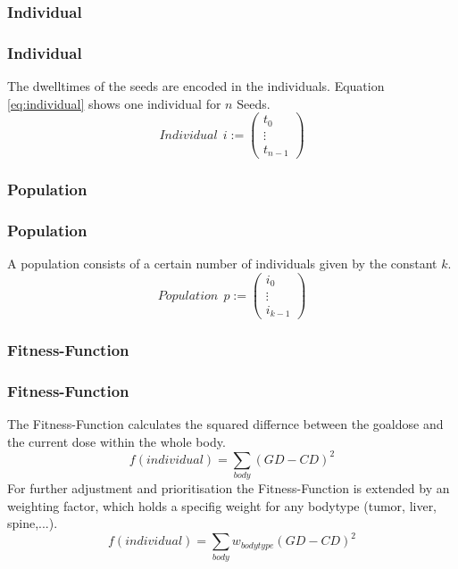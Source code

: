 \documentclass{beamer}
\begin{document}
\subsubsection{Individual}

 \begin{frame}
 \frametitle{Individual}
 The dwelltimes of the seeds are encoded in the individuals. Equation \eqref{eq:individual} shows one individual for $n  $ Seeds.
 \begin{equation}
 \label{eq:individual}
 Individual \ \ i := \begin{pmatrix}
 t_{0} \\ \vdots \\ t_{n-1} 	
\end{pmatrix}   
 \end{equation}
 \end{frame}
 
\subsubsection{Population}
 \begin{frame}
 \frametitle{Population}
 A population consists of a certain number of individuals given by the constant $ k $.
 \begin{equation}
 \label{eq:population}
 Population \ \ p := \begin{pmatrix}
 i_{0} \\ \vdots \\ i_{k-1} 	
\end{pmatrix}   
 \end{equation}
 \end{frame}
 
 \subsubsection{Fitness-Function}
 \begin{frame}
 \frametitle{Fitness-Function}
 The Fitness-Function calculates the squared differnce between the goaldose and the current dose within the whole body.
 \begin{equation}
 f(individual) = \sum_{body}(GD-CD)^2
 \end{equation}
 For further adjustment and prioritisation the Fitness-Function is extended by an weighting factor, which holds a specifig weight for any bodytype (tumor, liver, spine,...).
 \begin{equation}
 f(individual) = \sum_{body}w_{bodytype}(GD-CD)^2
 \end{equation}
 \end{frame}
 
\end{document}
